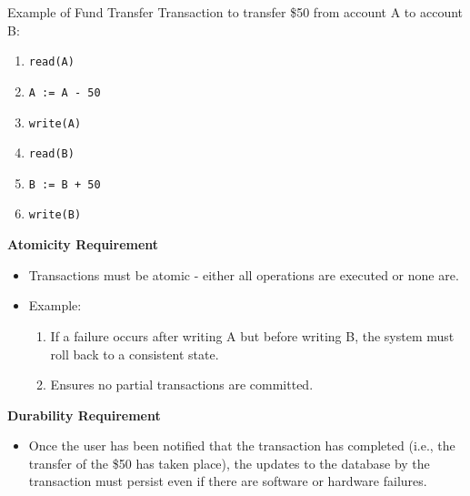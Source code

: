 \documentclass[aspectratio=169]{beamer}
\begin{document}
\begin{frame}{Example of Fund Transfer}
    \scriptsize
    Transaction to transfer \$50 from account A to account B:
    \begin{enumerate}
        \item \texttt{read(A)}
        \item \texttt{A := A - 50}
        \item \texttt{write(A)}
        \item \texttt{read(B)}
        \item \texttt{B := B + 50}
        \item \texttt{write(B)}
    \end{enumerate}

    \textbf{Atomicity Requirement}
    \begin{itemize}
        \item Transactions must be atomic - either all operations are executed or none are.
        \item Example:
        \begin{enumerate}
            \scriptsize
            \item If a failure occurs after writing A but before writing B, the system must roll back to a consistent state.
            \item Ensures no partial transactions are committed.
        \end{enumerate}
    \end{itemize}

    \textbf{Durability Requirement}
    \begin{itemize}
        \item Once the user has been notified that the transaction has completed (i.e., the transfer of the \$50 has taken place), the updates to the database by the transaction must persist even if there are software or hardware failures.
    \end{itemize}

\end{frame}
\end{document}
